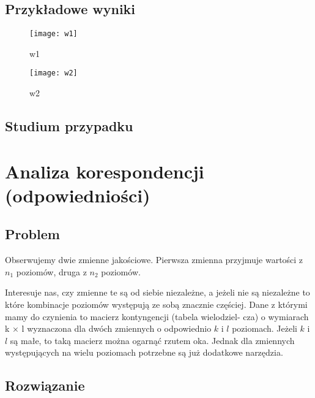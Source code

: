 \documentclass[polish,]{book}
\begin{document}
\hypertarget{part_55}{%
\section{Przykładowe wyniki}\label{part_55}}

\begin{figure}

{\centering \texttt{[image: w1]} 

}

\caption{w1}\label{fig:w1}
\end{figure}
\begin{figure}

{\centering \texttt{[image: w2]} 

}

\caption{w2}\label{fig:w2}
\end{figure}

\hypertarget{part_56}{%
\section{Studium przypadku}\label{part_56}}

\hypertarget{part_6}{%
\chapter{Analiza korespondencji (odpowiedniości)}\label{part_6}}

\hypertarget{part_61}{%
\section{Problem}\label{part_61}}

Obserwujemy dwie zmienne jakościowe. Pierwsza zmienna przyjmuje wartości z \(n_1\)
poziomów, druga z \(n_2\) poziomów.

Interesuje nas, czy zmienne te są od siebie niezależne, a jeżeli nie są niezależne
to które kombinacje poziomów występują ze sobą znacznie częściej.
Dane z którymi mamy do czynienia to macierz kontyngencji (tabela wielodziel-
cza) o wymiarach k × l wyznaczona dla dwóch zmiennych o odpowiednio \(k\) i \(l\) poziomach. Jeżeli \(k\) i \(l\) są małe, to taką macierz można ogarnąć rzutem oka. Jednak dla zmiennych występujących na wielu poziomach potrzebne są już dodatkowe narzędzia.

\hypertarget{part_62}{%
\section{Rozwiązanie}\label{part_62}}
\end{document}
